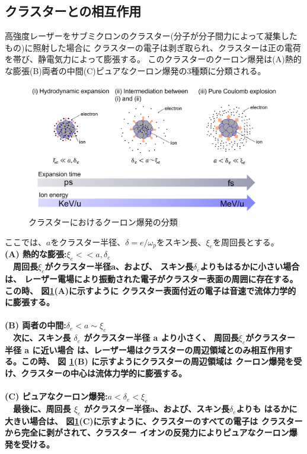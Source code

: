 \documentclass[a4paper,11pt,titlepage]{jsarticle}
\begin{document}
  \subsection{クラスターとの相互作用}%
  高強度レーザーをサブミクロンのクラスター(分子が分子間力によって凝集したもの\cite{m3})に照射した場合に
  クラスターの電子は剥ぎ取られ、クラスターは正の電荷を帯び、静電気力によって膨張する。
  このクラスターのクーロン爆発は(A)熱的な膨張(B)両者の中間(C)ピュアなクーロン爆発の3種類に分類される。\cite{Kishi}
  \begin{figure}[H]
    \begin{center}
      \includegraphics[keepaspectratio,width=\linewidth]{./image/2-1/2-1_explosion.png}
      \caption{
        クラスターにおけるクーロン爆発の分類
      }
      \label{fig:2-4}
    \end{center}
  \end{figure} 
  ここでは、$a$をクラスター半径、$\delta = e/\omega_p$をスキン長、$\xi_e$を周回長とする。\\
    \bf{(A) 熱的な膨張:$\xi_e << a,\delta_e$}\\
  　\rm{周回長$\xi_e$がクラスター半径a、および、
  スキン長$\delta_e$よりもはるかに小さい場合は、
  レーザー電場により振動された電子がクラスター表面の周囲に存在する。この時、
  図\ref{fig:2-4}(A)に示すように
  クラスター表面付近の電子は音速で流体力学的に膨張する。}\\
  \\
  \bf{(B) 両者の中間:$\delta_e < a\sim \xi_e$}\\
  　\rm{次に、スキン長 $\delta_e$ がクラスター半径 a より小さく、
  周回長$\xi_e$がクラスター半径 a に近い場合
  は、レーザー場はクラスターの周辺領域とのみ相互作用する。この時、
  図 \ref{fig:2-4}(B) に示すようにクラスターの周辺領域は
  クーロン爆発を受け、クラスターの中心は流体力学的に膨張する。}\\
  \\
  \bf{(C) ピュアなクーロン爆発:$a<\delta_e <\xi_e$}\\
  　\rm{最後に、周回長 $\xi_e$ がクラスター半径a、および、スキン長$\delta_e$よりも
  はるかに大きい場合は、 図\ref{fig:2-4}(C)に示すように、クラスターのすべての電子は
  クラスターから完全に剥がされて、クラスター
  イオンの反発力によりピュアなクーロン爆発を受ける。}\\
\end{document}
